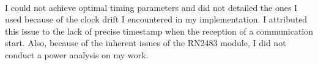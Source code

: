 \paragraph{}

I could not achieve optimal timing parameters and did not detailed the ones
I used because of the clock drift I encountered in my
implementation.
I attributed this issue to the lack of precise timestamp when the reception of
a communication start.
Also, because of the inherent issues of the RN2483 module, I did not conduct
a power analysis on my work.
